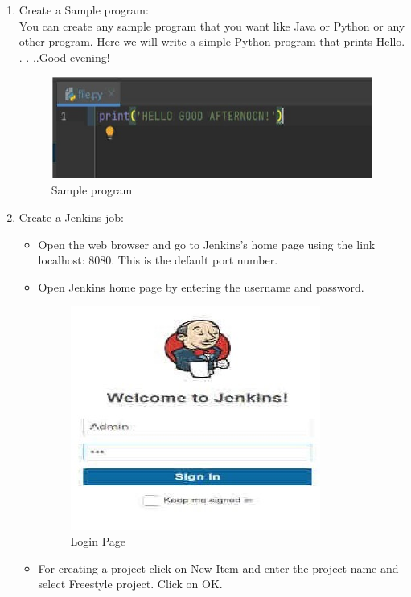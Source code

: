 \documentclass[12pt]{article}
\begin{document}
\begin{enumerate}
\item Create a Sample program:\\
You can create any sample program that you want like Java or Python or any other
program. Here we will write a simple Python program that prints Hello. . . ..Good
evening!


\begin{figure}[H]
\centering
\includegraphics[scale=0.8]{fig74}
\caption{Sample program}
\vspace{0.6\baselineskip}
\end{figure}

\item Create a Jenkins job:\\
\begin{itemize}
\item Open the web browser and go to Jenkins’s home page using the link localhost:
8080. This is the default port number.
\item Open Jenkins home page by entering the username and password.

\begin{figure}[H]
\centering
\includegraphics[scale=0.7]{fig75}
\caption{Login Page}
\vspace{0.6\baselineskip}
\end{figure}

\item For creating a project click on New Item and enter the project name and select Freestyle project. Click on OK.
\end{itemize}


\end{enumerate}
\end{document}
